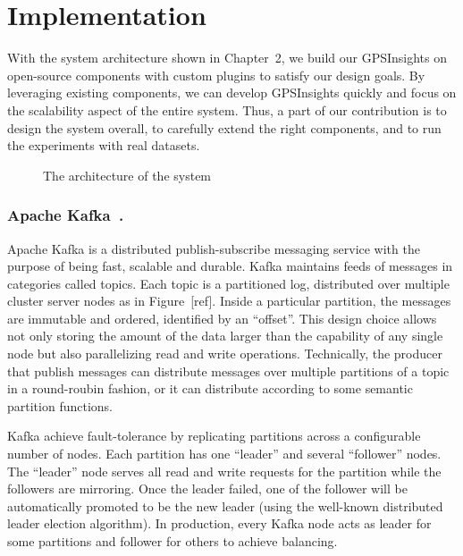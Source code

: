 \documentclass{acm_proc_article-sp}
\begin{document}
\section{Implementation} 

With the system architecture shown in Chapter~2, we build our GPSInsights on open-source components with custom plugins to satisfy our design goals. By leveraging existing components, we can develop GPSInsights quickly and focus on the scalability aspect of the entire system. Thus, a part of our contribution is to design the system overall, to carefully extend the right components, and to run the experiments with real datasets.  

\begin{figure}[h]
\centering
{}
\caption{The architecture of the system}
\end{figure}

\subsubsection{Apache Kafka~\cite{kafkapaper,kafkaweb}.} 

Apache Kafka is a distributed publish-subscribe messaging service with the purpose of being fast, scalable and durable. Kafka maintains feeds of messages in categories called topics. Each topic is a partitioned log, distributed over multiple cluster server nodes as in Figure~[ref]. Inside a particular partition, the messages are immutable and ordered, identified by an ``offset''. This design choice allows not only storing the amount of the data larger than the capability of any single node but also parallelizing read and write operations. Technically, the producer that publish messages can distribute messages over multiple partitions of a topic in a round-roubin fashion, or it can distribute according to some semantic partition functions.

Kafka achieve fault-tolerance by replicating partitions across a configurable number of nodes. Each partition has one ``leader'' and several ``follower'' nodes. The ``leader'' node serves all read and write requests for the partition while the followers are mirroring. Once the leader failed, one of the follower will be automatically promoted to be the new leader (using the well-known distributed leader election algorithm). In production, every Kafka node acts as leader for some partitions and follower for others to achieve balancing. 
\end{document}
